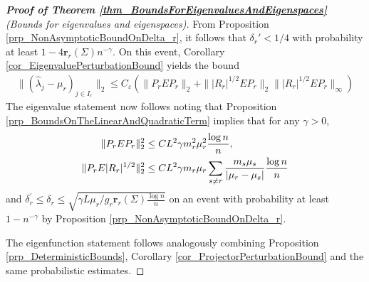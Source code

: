 \documentclass[a4paper,11pt]{article} %
\numberwithin{equation}{section}
\theoremstyle{definition}
\theoremstyle{remark}
\theoremstyle{plain}
\begin{document}
\begin{proof}[\normalfont \textbf{Proof of Theorem \ref{thm_BoundsForEigenvaluesAndEigenspaces}} (Bounds for eigenvalues and eigenspaces)]%
  \label{prf_BoundsForEigenvaluesAndEigenspaces}
  From Proposition \ref{prp_NonAsymptoticBoundOnDelta_r}, it follows that \( \delta_{r}' < 1/4 \) with probability at least \( 1 - 4 \mathbf{r}_{r}(\Sigma) n^{-\gamma} \).
  On this event, Corollary \ref{cor_EigenvaluePerturbationBound} yields the bound
  \begin{align}
          \|(\widehat\lambda_j-\mu_r)_{j\in I_r}\|_{2}
    \leq
          C_{\varepsilon} ( \| P_{r} E P_{r} \|_{2} + \| |R_{r}|^{1/2} E P_{r} \|_{2} 
                                                      \| |R_{r}|^{1/2} E P_{r} \|_{\infty})
  \end{align}
  The eigenvalue statement now follows noting that Proposition \ref{prp_BoundsOnTheLinearAndQuadraticTerm} implies that for any \(\gamma > 0 \), 
  \begin{align}
    \| P_{r} E P_{r} \|_{2}^2 & \le C L^2\gamma m_r^2 \mu_r^2 \frac{\log n}{n},
    \\
    \| P_{r} E | R_{r} |^{1/2} \|_{2}^2 & \le  C L^2\gamma m_r \mu_r \sum_{s\neq r}\frac{m_s\mu_s}{|\mu_r-\mu_s|}\frac{\log n}{n} 
    \notag
  \end{align}
  and  \( \delta_{r}^\prime \leq \delta_{r} \le \sqrt{\gamma L \mu_{r} / g_{r} \mathbf{ r }_{r}(\Sigma) \frac{\log n}{n}} \) on an event with probability at least \( 1 - n^{-\gamma} \) by Proposition \ref{prp_NonAsymptoticBoundOnDelta_r}.

  The eigenfunction statement follows analogously combining Proposition \ref{prp_DeterministicBounds}, Corollary \ref{cor_ProjectorPerturbationBound} and the same probabilistic estimates.
\end{proof}%
\end{document}
